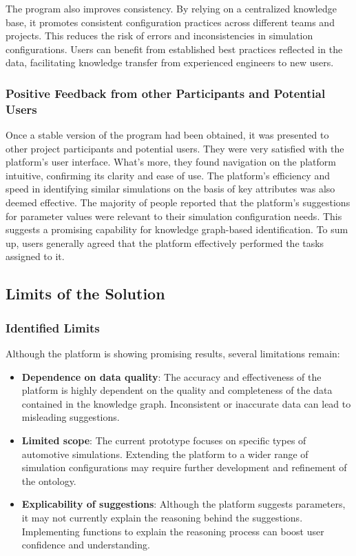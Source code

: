     The program also improves consistency. By relying on a centralized knowledge base, it promotes consistent configuration practices across different teams and projects. This reduces the risk of errors and inconsistencies in simulation configurations. Users can benefit from established best practices reflected in the data, facilitating knowledge transfer from experienced engineers to new users.\\

    
    \subsubsection{Positive Feedback from other Participants and Potential Users}
    Once a stable version of the program had been obtained, it was presented to other project participants and potential users. They were very satisfied with the platform's user interface. What's more, they found navigation on the platform intuitive, confirming its clarity and ease of use. The platform's efficiency and speed in identifying similar simulations on the basis of key attributes was also deemed effective. The majority of people reported that the platform's suggestions for parameter values were relevant to their simulation configuration needs. This suggests a promising capability for knowledge graph-based identification. To sum up, users generally agreed that the platform effectively performed the tasks assigned to it. 


\subsection{Limits of the Solution}
    \subsubsection{Identified Limits}
    Although the platform is showing promising results, several limitations remain:
    
    \begin{itemize}
        \item \textbf{Dependence on data quality}:  The accuracy and effectiveness of the platform is highly dependent on the quality and completeness of the data contained in the knowledge graph.  Inconsistent or inaccurate data can lead to misleading suggestions.

        \item \textbf{Limited scope}: The current prototype focuses on specific types of automotive simulations. Extending the platform to a wider range of simulation configurations may require further development and refinement of the ontology.

        \item \textbf{Explicability of suggestions}:  Although the platform suggests parameters, it may not currently explain the reasoning behind the suggestions. Implementing functions to explain the reasoning process can boost user confidence and understanding.
    \end{itemize}

